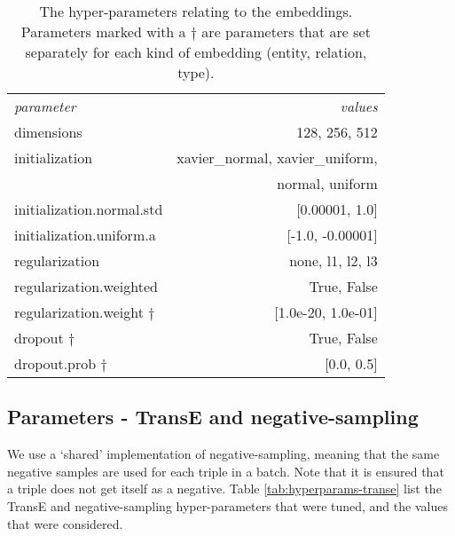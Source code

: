 \begin{table}[h!]
    \centering
    \begin{tabular}{lr}
        \toprule
        \textit{parameter}              & \textit{values}                   \\
        \cmidrule{1-2}
        dimensions                      & 128, 256, 512                     \\
        initialization                  & xavier\_normal, xavier\_uniform,  \\
                                        & normal, uniform \\
        initialization.normal.std       & [0.00001, 1.0]                    \\
        initialization.uniform.a        & [-1.0, -0.00001]                  \\
        \cmidrule{1-2}
        regularization                  & none, l1, l2, l3                  \\
        regularization.weighted         & True, False                       \\
        regularization.weight $\dagger$ & [1.0e-20, 1.0e-01]                \\
        \cmidrule{1-2}
        dropout $\dagger$               & True, False                       \\
        dropout.prob $\dagger$          & [0.0, 0.5]                        \\
        \bottomrule
    \end{tabular}
    \label{tab:hyperparams-embedding}
    \caption[The hyper-parameters relating to the embeddings.]{The hyper-parameters relating to the embeddings. Parameters marked with a $\dagger$ are parameters that are set separately for each kind of embedding (entity, relation, type).}
\end{table}

\subsection{Parameters - TransE and negative-sampling}
We use a `shared' implementation of negative-sampling, meaning that the same negative samples are used for each triple in a batch. Note that it is ensured that a triple does not get itself as a negative.
Table \ref{tab:hyperparams-transe} list the TransE and negative-sampling hyper-parameters that were tuned, and the values that were considered.

